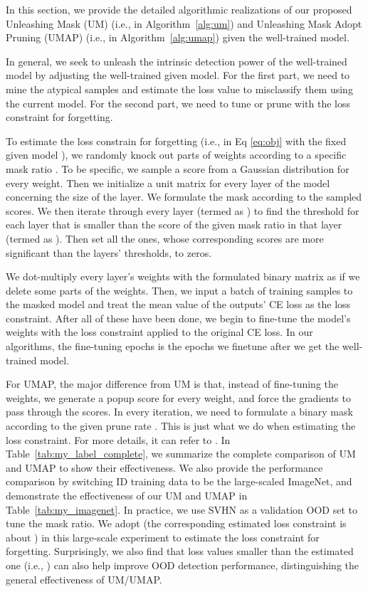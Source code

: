 \documentclass{article}
\theoremstyle{plain}
\theoremstyle{definition}
\theoremstyle{remark}
\begin{document}
In this section, we provide the detailed algorithmic realizations of our proposed Unleashing Mask (UM) (i.e., in Algorithm~\ref{alg:um}) and Unleashing Mask Adopt Pruning (UMAP) (i.e., in Algorithm~\ref{alg:umap}) given the well-trained model. 

In general, we seek to unleash the intrinsic detection power of the well-trained model by adjusting the well-trained given model. For the first part, we need to mine the atypical samples and estimate the loss value to misclassify them using the current model. For the second part, we need to tune or prune with the loss constraint for forgetting.

To estimate the loss constrain for forgetting (i.e.,  in Eq \ref{eq:obj} with the fixed given model ), we randomly knock out parts of weights according to a specific mask ratio . To be specific, we sample a score from a Gaussian distribution for every weight. Then we initialize a unit matrix for every layer of the model concerning the size of the layer. We formulate the mask  according to the sampled scores. We then iterate through every layer (termed as ) to find the threshold for each layer that is smaller than the score of the given mask ratio in that layer (termed as ). Then set all the ones, whose corresponding scores are more significant than the layers' thresholds, to zeros. 

We dot-multiply every layer's weights with the formulated binary matrix as if we delete some parts of the weights. Then, we input a batch of training samples to the masked model and treat the mean value of the outputs' CE loss as the loss constraint. After all of these have been done, we begin to fine-tune the model's weights with the loss constraint applied to the original CE loss. In our algorithms, the fine-tuning epochs  is the epochs we finetune after we get the well-trained model.

For UMAP, the major difference from UM is that, instead of fine-tuning the weights, we generate a popup score for every weight, and force the gradients to pass through the scores. In every iteration, we need to formulate a binary mask according to the given prune rate . This is just what we do when estimating the loss constraint. For more details, it can refer to \citep{ramanujan2020s}. In Table~\ref{tab:my_label_complete}, we summarize the complete comparison of UM and UMAP to show their effectiveness. We also provide the performance comparison by switching ID training data to be the large-scaled ImageNet, and demonstrate the effectiveness of our UM and UMAP in Table~\ref{tab:my_imagenet}. In practice, we use SVHN as a validation OOD set to tune the mask ratio. We adopt  (the corresponding estimated loss constraint is about ) in this large-scale experiment to estimate the loss constraint for forgetting. Surprisingly, we also find that loss values smaller than the estimated one (i.e., ) can also help improve OOD detection performance, distinguishing the general effectiveness of UM/UMAP.
\end{document}
